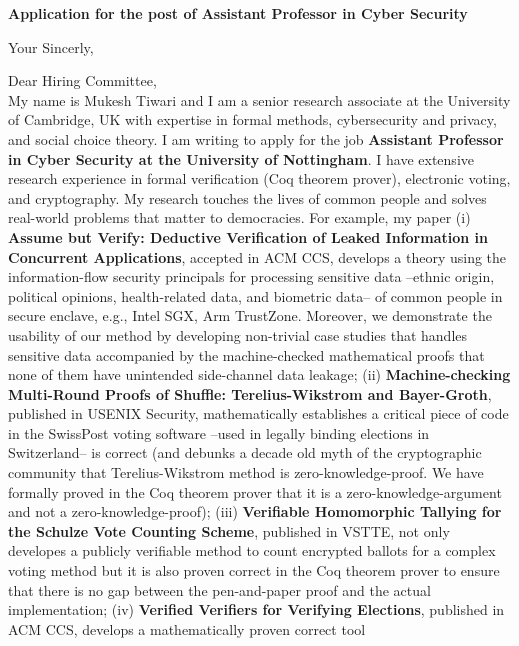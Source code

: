 \documentclass[11pt,a4paper,roman]{moderncv}
\begin{document}
\date{}
\opening{\textbf{Application for the post of Assistant Professor in Cyber Security}}
\closing{Your Sincerly, \vspace{-1em}}



\makelettertitle


Dear Hiring Committee, 
\\
\vspace{1em}
My name is Mukesh Tiwari and I am a senior research associate at 
the University of Cambridge, UK with expertise in  formal methods, cybersecurity and privacy, and social choice theory. 
I am writing to apply for the job \textbf{Assistant Professor in Cyber Security at the University of 
Nottingham}. I have extensive research experience in
formal verification (Coq theorem prover), electronic voting, and cryptography.
My research touches the lives of common people and solves 
real-world problems that matter to democracies. For example, my paper (i)
\textbf{Assume but Verify: Deductive Verification of Leaked Information in Concurrent Applications},
accepted in ACM CCS, develops a theory using the information-flow security principals 
for processing sensitive data --ethnic origin, political opinions,
health-related data, and  biometric data-- of common 
people in secure enclave, e.g., Intel SGX, Arm TrustZone. Moreover, 
we demonstrate the usability of our method by developing non-trivial case studies that handles 
sensitive data accompanied by the machine-checked mathematical proofs that none of them have unintended side-channel 
data leakage; 
(ii) \textbf{Machine-checking Multi-Round Proofs of Shuffle: Terelius-Wikstrom and Bayer-Groth}, 
published in USENIX Security, mathematically establishes a critical piece of 
code in the SwissPost voting software --used in legally binding 
elections in Switzerland-- is correct (and debunks a decade old myth of the cryptographic 
community that Terelius-Wikstrom method is zero-knowledge-proof. We have formally 
proved in the Coq theorem prover that it is a zero-knowledge-argument and not 
a zero-knowledge-proof);
(iii) \textbf{Verifiable Homomorphic Tallying for the Schulze Vote Counting Scheme}, published 
in VSTTE, not only developes a publicly verifiable method to count encrypted ballots for a complex voting method but it 
is also proven correct in the Coq theorem prover to ensure that there is no gap between 
the pen-and-paper proof and the actual implementation;  (iv) \textbf{Verified Verifiers for 
Verifying Elections}, published in ACM CCS, develops a mathematically proven correct tool 
\end{document}
